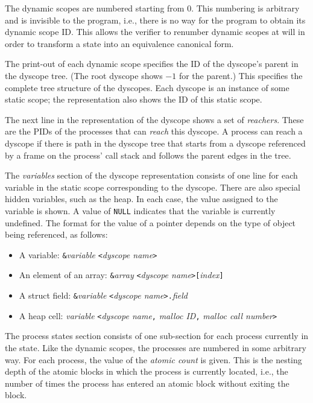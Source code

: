 The dynamic scopes are numbered starting from 0.  This numbering is
arbitrary and is invisible to the program, i.e., there is no way for
the program to obtain its dynamic scope ID.  This allows the verifier
to renumber dynamic scopes at will in order to transform a state into
an equivalence canonical form.

The print-out of each dynamic scope specifies the ID of the dyscope's
parent in the dyscope tree.  (The root dyscope shows $-1$ for the
parent.)  This specifies the complete tree structure of the dyscopes.
Each dyscope is an instance of some static scope; the representation
also shows the ID of this static scope.

The next line in the representation of the dyscope shows a set of
\emph{reachers}.  These are the PIDs of the processes that can
\emph{reach} this dyscope.  A process can reach a dyscope if there is
path in the dyscope tree that starts from a dyscope referenced by a
frame on the process' call stack and follows the parent edges in the
tree.

The \emph{variables} section of the dyscope representation consists of
one line for each variable in the static scope corresponding to the
dyscope.  There are also special hidden variables, such as the heap.
In each case, the value assigned to the variable is shown.  A value of
\texttt{NULL} indicates that the variable is currently undefined.  The format for the
value of a pointer depends on the type of object being referenced, as 
follows:
\begin{itemize}
\item A variable: {\tt \&}\emph{variable} {\tt <}\emph{dyscope name}{\tt >}
\item An element of an array: {\tt \&}\emph{array} {\tt <}\emph{dyscope name}{\tt >[}\emph{index}{\tt]}
\item A struct field: {\tt \&}\emph{variable} {\tt <}\emph{dyscope name}{\tt >.}\emph{field}
\item A heap cell: \emph{variable} {\tt <}\emph{dyscope name}{\tt,} \emph{malloc ID}{\tt,} \emph{malloc call number}{\tt >}
\end{itemize}

The process states section consists of one sub-section for each
process currently in the state.  Like the dynamic scopes, the
processes are numbered in some arbitrary way. For each process, the
value of the \emph{atomic count} is given.  This is the nesting depth
of the atomic blocks in which the process is currently located, i.e.,
the number of times the process has entered an atomic block without
exiting the block.

